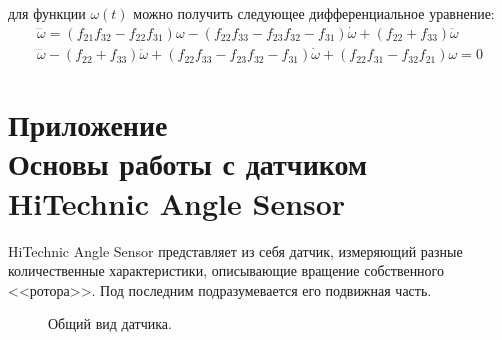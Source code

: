 \documentclass[12pt,a4paper,openany]{extarticle}
\begin{document}
для функции $\omega(t)$ можно получить следующее дифференциальное уравнение:
\begin{gather}
\dddot\omega = (f_{21}f_{32} - f_{22}f_{31})\omega - (f_{22}f_{33}-f_{23}f_{32}-f_{31})\dot\omega  + (f_{22}+f_{33})\ddot\omega\\
\dddot\omega - (f_{22}+f_{33})\ddot\omega + (f_{22}f_{33}-f_{23}f_{32}-f_{31})\dot\omega + (f_{22}f_{31} - f_{32}f_{21})\omega = 0
\end{gather}

\newpage
\section*{Приложение~\myappnum\label{append:angle_sensor}\\
Основы работы с датчиком HiTechnic Angle Sensor}
\hspace*{\parindent}HiTechnic Angle Sensor представляет из себя датчик, измеряющий разные количественные характеристики, описывающие вращение собственного <<ротора>>.
Под последним подразумевается его подвижная часть.

\begin{figure}[h]
	\noindent{}
	\caption{Общий вид датчика.}
	\label{sensor}
\end{figure}
\end{document}
